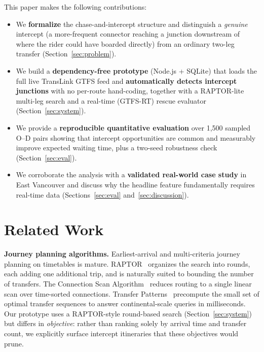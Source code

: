 \documentclass[conference]{IEEEtran}
\begin{document}
This paper makes the following contributions:
\begin{itemize}
  \item We \textbf{formalize} the chase-and-intercept structure and distinguish a
  \emph{genuine} intercept (a more-frequent connector reaching a junction
  downstream of where the rider could have boarded directly) from an ordinary
  two-leg transfer (Section~\ref{sec:problem}).
  \item We build a \textbf{dependency-free prototype} (Node.js + SQLite) that
  loads the full live TransLink GTFS feed and \textbf{automatically detects
  intercept junctions} with no per-route hand-coding, together with a RAPTOR-lite
  multi-leg search and a real-time (GTFS-RT) rescue evaluator
  (Section~\ref{sec:system}).
  \item We provide a \textbf{reproducible quantitative evaluation} over 1{,}500
  sampled O--D pairs showing that intercept opportunities are common and
  measurably improve expected waiting time, plus a two-seed robustness check
  (Section~\ref{sec:eval}).
  \item We corroborate the analysis with a \textbf{validated real-world case
  study} in East Vancouver and discuss why the headline feature fundamentally
  requires real-time data (Sections~\ref{sec:eval} and~\ref{sec:discussion}).
\end{itemize}

\section{Related Work}
\textbf{Journey planning algorithms.} Earliest-arrival and multi-criteria
journey planning on timetables is mature. RAPTOR~\cite{raptor} organizes the
search into rounds, each adding one additional trip, and is naturally suited to
bounding the number of transfers. The Connection Scan Algorithm~\cite{csa}
reduces routing to a single linear scan over time-sorted connections. Transfer
Patterns~\cite{transferpatterns} precompute the small set of optimal transfer
sequences to answer continental-scale queries in milliseconds. Our prototype uses
a RAPTOR-style round-based search (Section~\ref{sec:system}) but differs in
\emph{objective}: rather than ranking solely by arrival time and transfer count,
we explicitly surface intercept itineraries that these objectives would prune.
\end{document}
